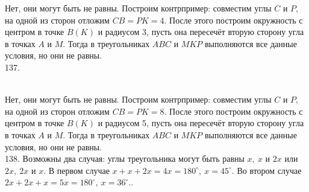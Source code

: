 \documentclass[12pt]{article}
\begin{document}
Нет, они могут быть не равны. Построим контрпример: совместим углы $C$ и $P,$ на одной из сторон отложим $CB=PK=4.$ После этого построим окружность с центром в точке $B(K)$ и радиусом 3, пусть она пересечёт вторую сторону угла в точках $A$ и $M.$ Тогда в треугольниках $ABC$ и $MKP$ выполняются все данные условия, но они не равны.\\
137. \begin{figure}[ht!]
\end{figure}\\
Нет, они могут быть не равны. Построим контрпример: совместим углы $C$ и $P,$ на одной из сторон отложим $CB=PK=8.$ После этого построим окружность с центром в точке $B(K)$ и радиусом 5, пусть она пересечёт вторую сторону угла в точках $A$ и $M.$ Тогда в треугольниках $ABC$ и $MKP$ выполняются все данные условия, но они не равны.\\
138. Возможны два случая: углы треугольника могут быть равны $x,\ x$ и $2x$ или $2x,\ 2x$ и $x.$ В первом случае $x+x+2x=4x=180^\circ,\ x=45^\circ.$ Во втором случае $2x+2x+x=5x=180^\circ,\ x=36^\circ.$\newpage{}. \begin{figure}[ht!]
\end{figure}\\
\end{document}
